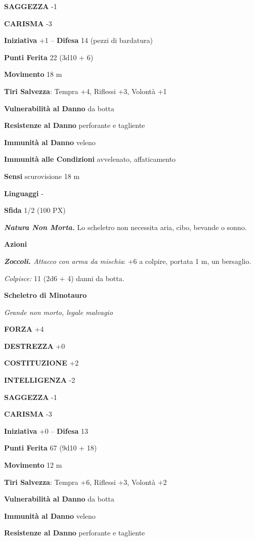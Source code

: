\begin{multicols}{2}
	\textbf{SAGGEZZA} -1

	\textbf{CARISMA} -3

	\textbf{Iniziativa} +1 -- \textbf{Difesa} 14 (pezzi di bardatura)

	\textbf{Punti Ferita} 22 (3d10 + 6)

	\textbf{Movimento} 18 m

	\textbf{Tiri Salvezza}: Tempra +4, Riflessi +3, Volontà +1

	\textbf{Vulnerabilità al Danno} da botta

	\textbf{Resistenze al Danno} perforante e tagliente

	\textbf{Immunità al Danno} veleno

	\textbf{Immunità alle Condizioni} avvelenato, affaticamento

	\textbf{Sensi} scurovisione 18 m

	\textbf{Linguaggi} -

	\textbf{Sfida} 1/2 (100 PX)

	\textit{\textbf{Natura Non Morta.}} Lo scheletro non necessita aria, cibo, bevande o sonno.

	\textbf{Azioni}

	\textit{\textbf{Zoccoli.} Attacco con arma da mischia}: +6 a colpire, portata 1 m, un bersaglio.

	\textit{Colpisce:} 11 (2d6 + 4) danni da botta.

	\medskip{}\textbf{Scheletro di Minotauro}

	\textit{Grande non morto, legale malvagio}

	\textbf{FORZA} +4

	\textbf{DESTREZZA} +0

	\textbf{COSTITUZIONE} +2

	\textbf{INTELLIGENZA} -2

	\textbf{SAGGEZZA} -1

	\textbf{CARISMA} -3

	\textbf{Iniziativa} +0 -- \textbf{Difesa} 13

	\textbf{Punti Ferita} 67 (9d10 + 18)

	\textbf{Movimento} 12 m

	\textbf{Tiri Salvezza}: Tempra +6, Riflessi +3, Volontà +2

	\textbf{Vulnerabilità al Danno} da botta

	\textbf{Immunità al Danno} veleno

	\textbf{Resistenze al Danno} perforante e tagliente


\end{multicols}
